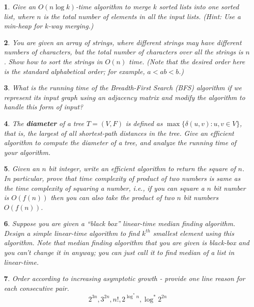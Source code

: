 \documentclass[%
addpoints]{exam}
\theoremstyle{problem}
\newtheorem{p}{}
\begin{document}
\begin{p}
Give an \( O(n \log k) \)-time algorithm to merge \( k \) sorted lists into one sorted list,  
where \( n \) is the total number of elements in all the input lists. (Hint: Use a min-heap for \( k \)-way merging.)
\hfill \end{p}

\begin{p}
You are given an array of strings, where different strings may have different  
numbers of characters, but the total number of characters over all the strings  
is \( n \). Show how to sort the strings in \( O(n) \) time.  
(Note that the desired order here is the standard alphabetical order; for example,  
\( a < ab < b \).)
\hfill \end{p}

\begin{p}
What is the running time of the Breadth-First Search (BFS) algorithm if we represent its input graph using an adjacency matrix and modify the algorithm to handle this form of input?
\hfill \end{p}

\begin{p}
The \textbf{diameter} of a tree \( T = (V, F) \) is defined as \( \max \{ \delta(u, v) : u, v \in V \} \), that is, the largest of all shortest-path distances in the tree. Give an efficient algorithm to compute the diameter of a tree, and analyze the running time of your algorithm.
\hfill \end{p}

\begin{p}
Given an $n$ bit integer, write an efficient algorithm to return the square of $n$. In particular, prove that time complexity of product of two numbers is same as the time complexity of squaring a number, i.e., if you can square a $n$ bit number is $ O(f(n) )$ then you can also take the product of two $n$ bit numbers $ O(f(n) )$.
\hfill \end{p}

\begin{p}
Suppose you are given a ``black box'' linear-time median finding algorithm. Design a simple linear-time algorithm to find $k^{th}$ smallest element using this algorithm. Note that median finding algorithm that you are given is black-box and you can't change it in anyway; you can just call it to find median of a list in linear-time.
\hfill \end{p}


\begin{p}
Order according to increasing asymptotic growth - provide one line reason for each consecutive pair.
\[
2^{3n},3^{2n},n!,2^{\log^*n},\log^* 2^{2n}
\]
\hfill \end{p}
\end{document}
